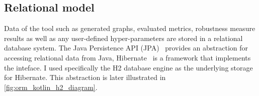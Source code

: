 \subsection{Relational model}

Data of the \graffs tool such as generated graphs, evaluated metrics, robustness measure results as well as any user-defined hyper-parameters are stored in a relational database system.
The Java Persistence API (JPA)~\cite{BiswasJavaPersistenceAPI2016} provides an abstraction for accessing relational data from Java, Hibernate~\cite{ElliottHibernateDeveloperNotebook2004,BauerJavaPersistenceHibernate2015} is a framework that implements the inteface.
I used specifically the H2 database engine\cite{MuellerH2DatabaseEngine2006} as the underlying storage for Hibernate.
This abstraction is later illustrated in \autoref{fig:orm_kotlin_h2_diagram}.



